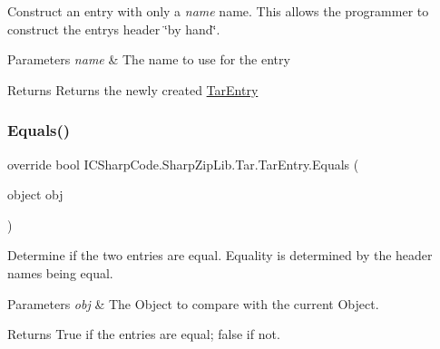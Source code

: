 Construct an entry with only a {\itshape name} name. This allows the programmer to construct the entry\textquotesingle{}s header \char`\"{}by hand\char`\"{}. 


\begin{DoxyParams}{Parameters}
{\em name} & The name to use for the entry\\
\hline
\end{DoxyParams}
\begin{DoxyReturn}{Returns}
Returns the newly created \hyperlink{class_i_c_sharp_code_1_1_sharp_zip_lib_1_1_tar_1_1_tar_entry}{Tar\+Entry}
\end{DoxyReturn}
\mbox{\label{class_i_c_sharp_code_1_1_sharp_zip_lib_1_1_tar_1_1_tar_entry_a92ca060b2f9636dc6d1c78048848268e}} 
\subsubsection{\texorpdfstring{Equals()}{Equals()}}
{\footnotesize\ttfamily override bool I\+C\+Sharp\+Code.\+Sharp\+Zip\+Lib.\+Tar.\+Tar\+Entry.\+Equals (\begin{DoxyParamCaption}\item[{object}]{obj }\end{DoxyParamCaption})\hspace{0.3cm}{\ttfamily [inline]}}



Determine if the two entries are equal. Equality is determined by the header names being equal. 


\begin{DoxyParams}{Parameters}
{\em obj} & The Object to compare with the current Object.\\
\hline
\end{DoxyParams}
\begin{DoxyReturn}{Returns}
True if the entries are equal; false if not. 
\end{DoxyReturn}
\mbox{\label{class_i_c_sharp_code_1_1_sharp_zip_lib_1_1_tar_1_1_tar_entry_a828b43a3b22aea55b0a8a7f3de0b6b3b}} 
